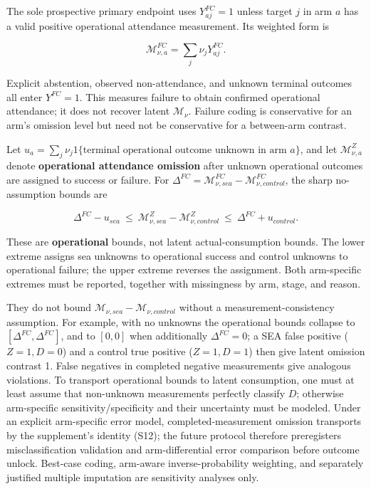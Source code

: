 \documentclass[
  11pt]{article}
\begin{document}
The sole prospective primary endpoint uses \(Y^{FC}_{aj}=1\) unless
target \(j\) in arm \(a\) has a valid positive operational attendance
measurement. Its weighted form is

\[\mathcal M^{FC}_{\nu,a}=\sum_j\nu_jY^{FC}_{aj}.\tag{5}\]

Explicit abstention, observed non-attendance, and unknown terminal
outcomes all enter \(Y^{FC}=1\). This measures failure to obtain
confirmed operational attendance; it does not recover latent
\(\mathcal M_\nu\). Failure coding is conservative for an arm's omission
level but need not be conservative for a between-arm contrast.

Let
\(u_a=\sum_j\nu_j1\{\text{terminal operational outcome unknown in arm }a\}\),
and let \(\mathcal M_{\nu,a}^{Z}\) denote \textbf{operational attendance
omission} after unknown operational outcomes are assigned to success or
failure. For
\(\Delta^{FC}=\mathcal M^{FC}_{\nu,sea}-\mathcal M^{FC}_{\nu,control}\),
the sharp no-assumption bounds are

\[\Delta^{FC}-u_{sea}\ \le\ \mathcal M_{\nu,sea}^{Z}-\mathcal M_{\nu,control}^{Z}\ \le\ \Delta^{FC}+u_{control}.\tag{6}\]

These are \textbf{operational} bounds, not latent actual-consumption
bounds. The lower extreme assigns sea unknowns to operational success
and control unknowns to operational failure; the upper extreme reverses
the assignment. Both arm-specific extremes must be reported, together
with missingness by arm, stage, and reason.

They do not bound \(\mathcal M_{\nu,sea}-\mathcal M_{\nu,control}\)
without a measurement-consistency assumption. For example, with no
unknowns the operational bounds collapse to
\([\Delta^{FC},\Delta^{FC}]\), and to \([0,0]\) when additionally
\(\Delta^{FC}=0\); a SEA false positive (\(Z=1,D=0\)) and a control true
positive (\(Z=1,D=1\)) then give latent omission contrast 1. False
negatives in completed negative measurements give analogous violations.
To transport operational bounds to latent consumption, one must at least
assume that non-unknown measurements perfectly classify \(D\); otherwise
arm-specific sensitivity/specificity and their uncertainty must be
modeled. Under an explicit arm-specific error model,
completed-measurement omission transports by the supplement's identity
(S12); the future protocol therefore preregisters misclassification
validation and arm-differential error comparison before outcome unlock.
Best-case coding, arm-aware inverse-probability weighting, and
separately justified multiple imputation are sensitivity analyses only.
\end{document}
